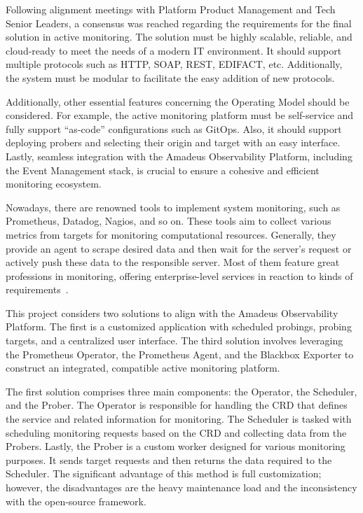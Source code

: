 Following alignment meetings with Platform Product Management and Tech Senior Leaders, a consensus was reached regarding the requirements for the final solution in active monitoring. The solution must be highly scalable, reliable, and cloud-ready to meet the needs of a modern \ac{IT} environment. It should support multiple protocols such as \ac{HTTP}, \ac{SOAP}, \ac{REST}, \ac{EDIFACT}, etc. Additionally, the system must be modular to facilitate the easy addition of new protocols.

Additionally, other essential features concerning the Operating Model should be considered. For example, the active monitoring platform must be self-service and fully support “as-code” configurations such as GitOps. Also, it should support deploying probers and selecting their origin and target with an easy interface. Lastly, seamless integration with the Amadeus Observability Platform, including the Event Management stack, is crucial to ensure a cohesive and efficient monitoring ecosystem.

Nowadays, there are renowned tools to implement system monitoring, such as Prometheus, Datadog, Nagios, and so on. These tools aim to collect various metrics from targets for monitoring computational resources. Generally, they provide an agent to scrape desired data and then wait for the server's request or actively push these data to the responsible server. Most of them feature great professions in monitoring, offering enterprise-level services in reaction to kinds of requirements~\parencite{nevesDetailedBlackboxMonitoring2021}.

This project considers two solutions to align with the Amadeus Observability Platform. The first is a customized application with scheduled probings, probing targets, and a centralized user interface. The third solution involves leveraging the Prometheus Operator, the Prometheus Agent, and the Blackbox Exporter to construct an integrated, compatible active monitoring platform. 

The first solution comprises three main components: the Operator, the Scheduler, and the Prober. The Operator is responsible for handling the \ac{CRD} that defines the service and related information for monitoring. The Scheduler is tasked with scheduling monitoring requests based on the \ac{CRD} and collecting data from the Probers. Lastly, the Prober is a custom worker designed for various monitoring purposes. It sends target requests and then returns the data required to the Scheduler. The significant advantage of this method is full customization; however, the disadvantages are the heavy maintenance load and the inconsistency with the open-source framework. 

